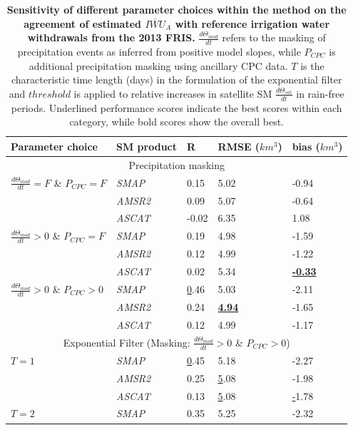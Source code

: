 \documentclass[hess, manuscript]{copernicus}
\begin{document}
\begin{table}[t]
\centering
\caption{\textbf{Sensitivity of different parameter choices within the method on the agreement of estimated $\overline{IWU}_{A}$ with reference irrigation water withdrawals from the 2013 FRIS.} $\frac{d\Theta_{mod}}{dt}$ refers to the masking of precipitation events as inferred from positive model slopes, while $P_{CPC}$ is additional precipitation masking using ancillary CPC data. $T$ is the characteristic time length (days) in the formulation of the exponential filter and  $threshold$ is applied to relative increases in satellite SM $\frac{d\Theta_{sat}}{dt}$ in rain-free periods. Underlined performance scores indicate the best scores within each category, while bold scores show the overall best.}
\label{table:method-evaluation}
\begin{tabular}{@{}lllll@{}}
\toprule
\textbf{Parameter choice} & \textbf{SM product} & \textbf{R} & \textbf{RMSE ($km^{3}$)} & \textbf{bias ($km^{3}$)} \\ \midrule
\multicolumn{5}{c}{Precipitation masking} \\ \midrule
$\frac{d\Theta_{mod}}{dt} = F$ \& $P_{CPC} = F$ & \textit{SMAP} & 0.15 & 5.02 & -0.94 \\
\textbf{} & \textit{AMSR2} & 0.09 & 5.07 & -0.64 \\
\textbf{} & \textit{ASCAT} & -0.02 & 6.35 & 1.08 \\
$\frac{d\Theta_{mod}}{dt} > 0$ \& $P_{CPC} = F$ & \textit{SMAP} & 0.19 & 4.98 & -1.59 \\
\textbf{} & \textit{AMSR2} & 0.12 & 4.99 & -1.22 \\
\textbf{} & \textit{ASCAT} & 0.02 & 5.34 & {\ul \textbf{-0.33}} \\
$\frac{d\Theta_{mod}}{dt} > 0$ \& $P_{CPC} > 0$ & \textit{SMAP} & {\ul 0.46} & 5.03 & -2.11 \\
\textit{} & \textit{AMSR2} & 0.24 & {\ul \textbf{4.94}} & -1.65 \\
\textit{} & \textit{ASCAT} & 0.12 & 4.99 & -1.17 \\ \midrule
\multicolumn{5}{c}{Exponential Filter (Masking: $\frac{d\Theta_{mod}}{dt} > 0$ \& $P_{CPC} > 0$)} \\ \midrule
$T=1$ & \textit{SMAP} & {\ul 0.45} & 5.18 & -2.27 \\
 & \textit{AMSR2} & 0.25 & {\ul 5.08} & -1.98 \\
\textit{} & \textit{ASCAT} & 0.13 & {\ul 5.08} & {\ul -1.78} \\
$T=2$ & \textit{SMAP} & 0.35 & 5.25 & -2.32 \\

\end{tabular}
\end{table}
\end{document}
